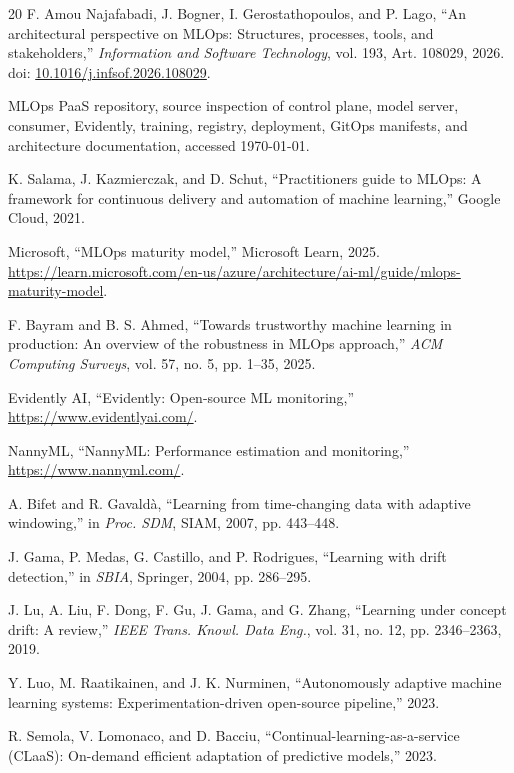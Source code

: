 \documentclass[11pt,a4paper]{article}
\begin{document}
\begin{thebibliography}{20}
F. Amou Najafabadi, J. Bogner, I. Gerostathopoulos, and P. Lago,
``An architectural perspective on MLOps: Structures, processes, tools, and stakeholders,''
\emph{Information and Software Technology}, vol. 193, Art. 108029, 2026.
doi: \href{https://doi.org/10.1016/j.infsof.2026.108029}{10.1016/j.infsof.2026.108029}.

MLOps PaaS repository, source inspection of control plane, model server, consumer, Evidently, training, registry, deployment, GitOps manifests, and architecture documentation, accessed \today.

K. Salama, J. Kazmierczak, and D. Schut,
``Practitioners guide to MLOps: A framework for continuous delivery and automation of machine learning,'' Google Cloud, 2021.

Microsoft, ``MLOps maturity model,'' Microsoft Learn, 2025.
\url{https://learn.microsoft.com/en-us/azure/architecture/ai-ml/guide/mlops-maturity-model}.

F. Bayram and B. S. Ahmed,
``Towards trustworthy machine learning in production: An overview of the robustness in MLOps approach,''
\emph{ACM Computing Surveys}, vol. 57, no. 5, pp. 1--35, 2025.

Evidently AI, ``Evidently: Open-source ML monitoring,'' \url{https://www.evidentlyai.com/}.

NannyML, ``NannyML: Performance estimation and monitoring,'' \url{https://www.nannyml.com/}.

A. Bifet and R. Gavald\`{a},
``Learning from time-changing data with adaptive windowing,''
in \emph{Proc. SDM}, SIAM, 2007, pp. 443--448.

J. Gama, P. Medas, G. Castillo, and P. Rodrigues,
``Learning with drift detection,''
in \emph{SBIA}, Springer, 2004, pp. 286--295.

J. Lu, A. Liu, F. Dong, F. Gu, J. Gama, and G. Zhang,
``Learning under concept drift: A review,''
\emph{IEEE Trans. Knowl. Data Eng.}, vol. 31, no. 12, pp. 2346--2363, 2019.

Y. Luo, M. Raatikainen, and J. K. Nurminen,
``Autonomously adaptive machine learning systems: Experimentation-driven open-source pipeline,''
2023.

R. Semola, V. Lomonaco, and D. Bacciu,
``Continual-learning-as-a-service (CLaaS): On-demand efficient adaptation of predictive models,''
2023.
\end{thebibliography}
\end{document}
